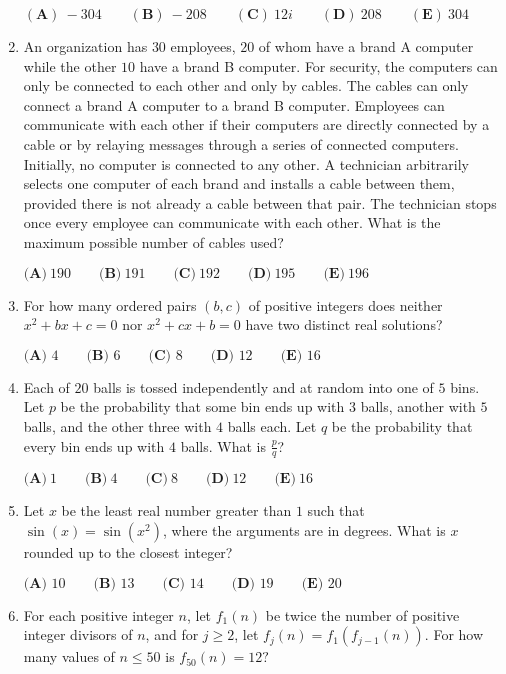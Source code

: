 \documentclass{article}
\begin{document}
\begin{enumerate}[label=\arabic*., itemsep=0.5em]
$(\textbf{A})\: {-}304\qquad(\textbf{B}) \: {-}208\qquad(\textbf{C}) \: 12i\qquad(\textbf{D}) \: 208\qquad(\textbf{E}) \: 304$\par \vspace{0.5em}\item An organization has $30$ employees, $20$ of whom have a brand A computer while the other $10$ have a brand B computer. For security, the computers can only be connected to each other and only by cables. The cables can only connect a brand A computer to a brand B computer. Employees can communicate with each other if their computers are directly connected by a cable or by relaying messages through a series of connected computers. Initially, no computer is connected to any other. A technician arbitrarily selects one computer of each brand and installs a cable between them, provided there is not already a cable between that pair. The technician stops once every employee can communicate with each other. What is the maximum possible number of cables used?

$\textbf{(A)}\ 190  \qquad\textbf{(B)}\  191 \qquad\textbf{(C)}\  192 \qquad\textbf{(D)}\
 195 \qquad\textbf{(E)}\ 196$\par \vspace{0.5em}\item For how many ordered pairs $(b,c)$ of positive integers does neither $x^2+bx+c=0$ nor $x^2+cx+b=0$ have two distinct real solutions?

$\textbf{(A) } 4 \qquad \textbf{(B) } 6 \qquad \textbf{(C) } 8 \qquad \textbf{(D) } 12 \qquad \textbf{(E) } 16 \qquad$\par \vspace{0.5em}\item Each of $20$ balls is tossed independently and at random into one of $5$ bins. Let $p$ be the probability that some bin ends up with $3$ balls, another with $5$ balls, and the other three with $4$ balls each. Let $q$ be the probability that every bin ends up with $4$ balls. What is $\frac{p}{q}$?

$\textbf{(A)}\ 1 \qquad\textbf{(B)}\  4 \qquad\textbf{(C)}\  8 \qquad\textbf{(D)}\  12 \qquad\textbf{(E)}\ 16$\par \vspace{0.5em}\item Let $x$ be the least real number greater than $1$ such that $\sin(x) = \sin(x^2)$, where the arguments are in degrees. What is $x$ rounded up to the closest integer?

$\textbf{(A) } 10 \qquad \textbf{(B) } 13 \qquad \textbf{(C) } 14 \qquad \textbf{(D) } 19 \qquad \textbf{(E) } 20$\par \vspace{0.5em}\item For each positive integer $n$, let $f_1(n)$ be twice the number of positive integer divisors of $n$, and for $j \ge 2$, let $f_j(n) = f_1(f_{j-1}(n))$. For how many values of $n \le 50$ is $f_{50}(n) = 12?$


\end{enumerate}
\end{document}

